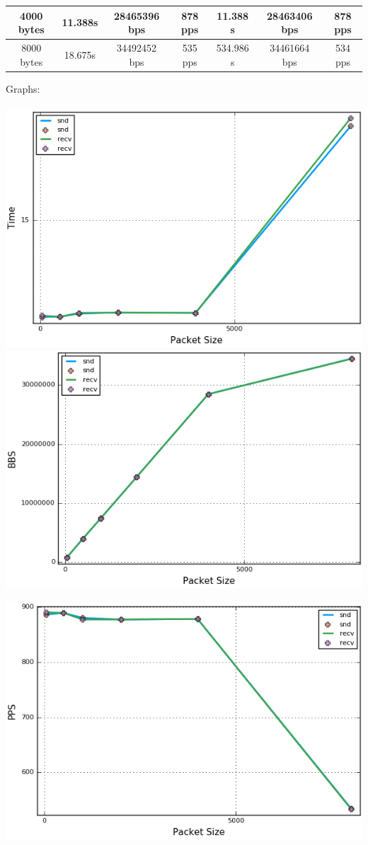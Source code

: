 \documentclass[12pt]{article}
\newenvironment{problem}[2][Problem]{\begin{trivlist}
\item[\hskip \labelsep {\bfseries #1}\hskip \labelsep {\bfseries #2.}]}{\end{trivlist}}
\begin{document}
\begin{problem}{2}
\begin{center}
\begin{tabular}{|c|c|c|c|c|c|c|}
	4000 bytes 		  		   & 11.388s &  28465396 bps& 878 pps & 11.388 s &28463406 bps& 878 pps\\ \hline
	8000 bytes 		  		   & 18.675s &  34492452 bps& 535 pps & 534.986 s &34461664 bps&534 pps\\ \hline
	\end{tabular}
\end{center}
Graphs:\\
\\
\includegraphics[scale=.6]{6.png}
\includegraphics[scale=.6]{7.png}\\
\begin{center}
\includegraphics[scale=.6]{8.png}	

\end{center}
\end{problem}
\end{document}

